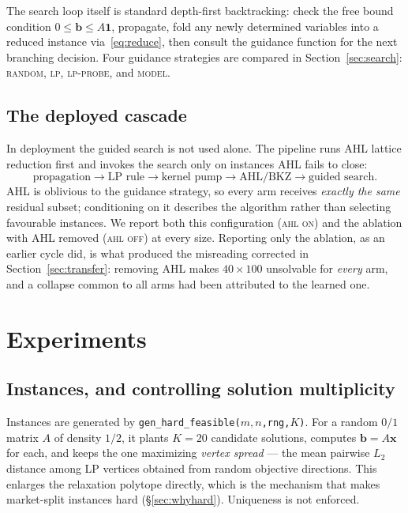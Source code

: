 \documentclass[12pt]{article}
\begin{document}
The search loop itself is standard depth-first backtracking: check the free bound condition $0\le\mathbf{b}\le A\mathbf{1}$, propagate, fold any newly determined variables into a reduced instance via~\eqref{eq:reduce}, then consult the guidance function for the next branching decision. Four guidance strategies are compared in Section~\ref{sec:search}: \textsc{random}, \textsc{lp}, \textsc{lp-probe}, and \textsc{model}.

\subsection{The deployed cascade}
\label{sec:m-cascade}

In deployment the guided search is not used alone. The pipeline runs AHL lattice reduction first and invokes the search only on instances AHL fails to close:
\begin{equation}
\text{propagation} \to \text{LP rule} \to \text{kernel pump} \to \text{AHL/BKZ} \to \text{guided search}.
\end{equation}
AHL is oblivious to the guidance strategy, so every arm receives \emph{exactly the same} residual subset; conditioning on it describes the algorithm rather than selecting favourable instances. We report both this configuration (\textsc{ahl on}) and the ablation with AHL removed (\textsc{ahl off}) at every size. Reporting only the ablation, as an earlier cycle did, is what produced the misreading corrected in Section~\ref{sec:transfer}: removing AHL makes $40\times100$ unsolvable for \emph{every} arm, and a collapse common to all arms had been attributed to the learned one.

\section{Experiments}
\label{sec:exp}

\subsection{Instances, and controlling solution multiplicity}
\label{sec:instances}

Instances are generated by \texttt{gen\_hard\_feasible($m,n$,rng,$K$)}. For a random $0/1$ matrix $A$ of density $1/2$, it plants $K=20$ candidate solutions, computes $\mathbf{b}=A\mathbf{x}$ for each, and keeps the one maximizing \emph{vertex spread} --- the mean pairwise $L_2$ distance among LP vertices obtained from random objective directions. This enlarges the relaxation polytope directly, which is the mechanism that makes market-split instances hard (\S\ref{sec:whyhard}). Uniqueness is not enforced.
\end{document}
